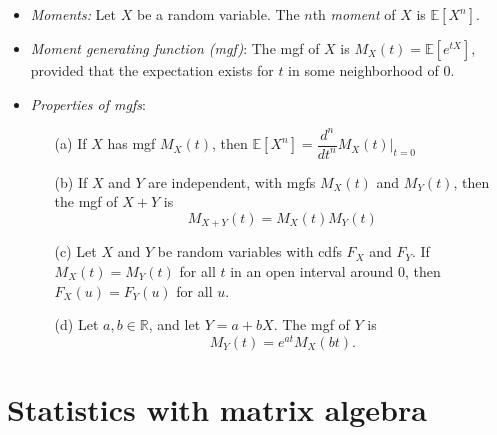 \documentclass[11pt]{article}
\begin{document}
\begin{itemize}
\item \textit{Moments:} Let $X$ be a random variable. The $n$th \textit{moment} of $X$ is $\mathbb{E}[X^n]$.

\item \textit{Moment generating function (mgf)}: The mgf of $X$ is $M_X(t) = \mathbb{E}[e^{tX}]$, provided that the expectation exists for $t$ in some neighborhood of 0.

\item \textit{Properties of mgfs}:
\begin{enumerate}
\item[(a)] If $X$ has mgf $M_X(t)$, then $\mathbb{E}[X^n] = \dfrac{d^n}{dt^n} M_X(t) \biggr\rvert_{t = 0}$
\item[(b)] If $X$ and $Y$ are independent, with mgfs $M_X(t)$ and $M_Y(t)$, then the mgf of $X + Y$ is 
$$M_{X+Y}(t) = M_X(t) M_Y(t)$$
\item[(c)] Let $X$ and $Y$ be random variables with cdfs $F_X$ and $F_Y$. If $M_X(t) = M_Y(t)$ for all $t$ in an open interval around 0, then $F_X(u) = F_Y(u)$ for all $u$.
\item[(d)] Let $a, b \in \mathbb{R}$, and let $Y = a + bX$. The mgf of $Y$ is
$$M_Y(t) = e^{at}M_X(bt).$$
\end{enumerate}
\end{itemize}

\section*{Statistics with matrix algebra}
\end{document}
